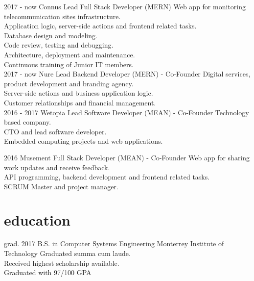 \documentclass[]{friggeri-cv}
\begin{document}
\begin{entrylist}
  \entry
    {2017 - now}
    {Connus}
    {Lead Full Stack Developer (MERN)}
    {Web app for monitoring telecommunication sites infrastructure.\\
    Application logic, server-side actions and frontend related tasks.\\
    Database design and modeling. \\
    Code review, testing and debugging.\\
    Architecture, deployment and maintenance. \\
    Continuous training of Junior IT members. \\
    }
\entry
    {2017 - now}
    {Nure}
    {Lead Backend Developer (MERN) - Co-Founder}
    {Digital services, product development and branding agency.\\
    Server-side actions and business application logic.\\
    Customer relationships and financial management. \\
    }
 \entry
    {2016 - 2017}
    {Wetopia}
    {Lead Software Developer (MEAN) - Co-Founder}
    {Technology based company.\\
    CTO and lead software developer.\\
    Embedded computing projects and web applications. \\
    }

\entry
    {2016}
    {Musement}
    {Full Stack Developer (MEAN) - Co-Founder}
    {Web app for sharing work updates and receive feedback.\\
    API programming, backend development and frontend related tasks.\\
    SCRUM Master and project manager.
    }
\end{entrylist}

\section{education}

\begin{entrylist}
  \entry
    {grad. 2017}
    {B.S. in Computer Systems Engineering}
    {Monterrey Institute of Technology}
    {Graduated summa cum laude. \\
    Received highest scholarship available.\\
    Graduated with 97/100 GPA}
\end{entrylist}
\end{document}
